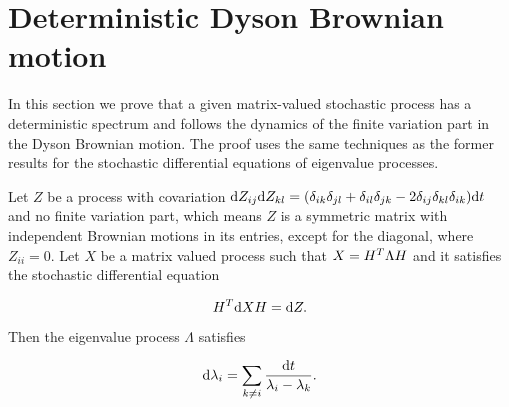 \section{Deterministic Dyson Brownian motion}

In this section we prove that a given matrix-valued stochastic process has a deterministic spectrum and follows the dynamics of the finite variation part in the Dyson Brownian motion. The proof uses the same techniques as the former results for the stochastic differential equations of eigenvalue processes. 

\begin{theorem}

Let $Z$ be a process with covariation $\mathrm d Z_{ij}\mathrm d Z_{kl} = (\delta_{ik}\delta_{jl} + \delta_{il}\delta_{jk} - 2\delta_{ij}\delta_{kl}\delta_{ik} )\mathrm d t$ and no finite variation part, which means $Z$ is a symmetric matrix with independent Brownian motions in its entries, except for the diagonal, where $Z_{ii} = 0$. Let $X$ be a matrix valued process such that  $X = H^T \Lambda H$ and it satisfies the stochastic differential equation


\begin{equation*}
     H^T \mathrm d X H = \mathrm d Z.
\end{equation*}

Then the eigenvalue process $\Lambda$ satisfies

\begin{equation*}
    \mathrm d \lambda_i = \sum_{k\neq i} \frac{\mathrm d t}{\lambda_i - \lambda_k}.
\end{equation*}

\end{theorem}

